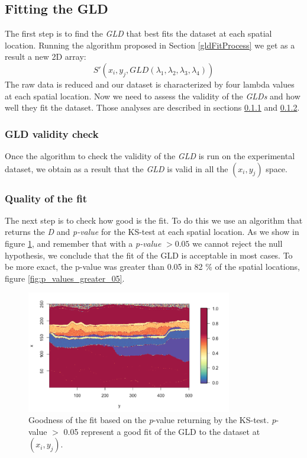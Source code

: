 \subsection{Fitting the GLD}
The first step is to find the \textit{GLD} that best fits the dataset at each spatial location. Running the algorithm proposed in Section \ref{gldFitProcess} we get as a result a new 2D array:
\begin{equation}\label{eq:gld_fit_2D}
S'(x_{i},y_{j},GLD(\lambda_{1}, \lambda_{2}, \lambda_{3}, \lambda_{4}))
\end{equation}
The raw data is reduced and our dataset is characterized by four lambda values at each spatial location. Now we need to assess the validity of the \textit{GLDs} and how well they fit the dataset. Those analyses are described in sections \ref{useCaseGLDValidityCheck} and \ref{useCaseQualityofFit}. 

\subsubsection{GLD validity check}\label{useCaseGLDValidityCheck}
Once the algorithm to check the validity of the \textit{GLD} is run on the experimental dataset, we obtain as a result that the \textit{GLD} is valid in all the $(x_{i},y_{j})$ space.

\subsubsection{Quality of the fit}\label{useCaseQualityofFit}
The next step is to check how good is the fit. To do this we use an algorithm that returns the \textit{D} and \textit{p-value} for the KS-test at each spatial location. As we show in figure \ref{fig:p_value}, and remember that with a \textit{p-value} $>0.05$ we cannot reject the null hypothesis, we conclude that the fit of the GLD is acceptable in most cases. To be more exact, the p-value was greater than 0.05 in 82 \% of the spatial locations, figure \ref{fig:p_values_greater_05}.

\begin{figure}[H]
    \centering
    \includegraphics[width=0.8\textwidth]{images/p_value.png}
    \caption{Goodness of the fit based on the \textit{p}-value returning by the KS-test. \textit{p}-value $>$ 0.05 represent a good fit of the GLD to the dataset at $(x_{i}, y_{j})$.}
    \label{fig:p_value}
\end{figure}

